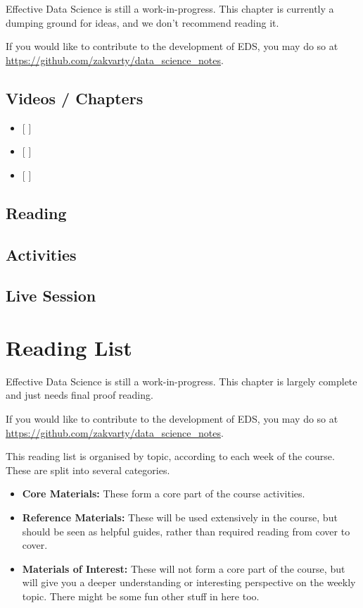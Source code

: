 \documentclass[
  12pt,
]{book}
\begin{document}
Effective Data Science is still a work-in-progress. This chapter is currently a dumping ground for ideas, and we don't recommend reading it.

If you would like to contribute to the development of EDS, you may do so at \url{https://github.com/zakvarty/data_science_notes}.

\hypertarget{videos-chapters-4}{%
\section{Videos / Chapters}\label{videos-chapters-4}}

\begin{itemize}
\item
  {[} {]}
\item
  {[} {]}
\item
  {[} {]}
\end{itemize}

\hypertarget{reading-4}{%
\section{Reading}\label{reading-4}}

\hypertarget{activities-2}{%
\section{Activities}\label{activities-2}}

\hypertarget{live-session-4}{%
\section{Live Session}\label{live-session-4}}

\hypertarget{reading-list}{%
\chapter{Reading List}\label{reading-list}}

Effective Data Science is still a work-in-progress. This chapter is largely complete and just needs final proof reading.

If you would like to contribute to the development of EDS, you may do so at \url{https://github.com/zakvarty/data_science_notes}.

This reading list is organised by topic, according to each week of the course. These are split into several categories.

\begin{itemize}
\item
  \textbf{Core Materials:} These form a core part of the course activities.
\item
  \textbf{Reference Materials:} These will be used extensively in the course, but should be seen as helpful guides, rather than required reading from cover to cover.
\item
  \textbf{Materials of Interest:} These will not form a core part of the course, but will give you a deeper understanding or interesting perspective on the weekly topic. There might be some fun other stuff in here too.
\end{itemize}
\end{document}
